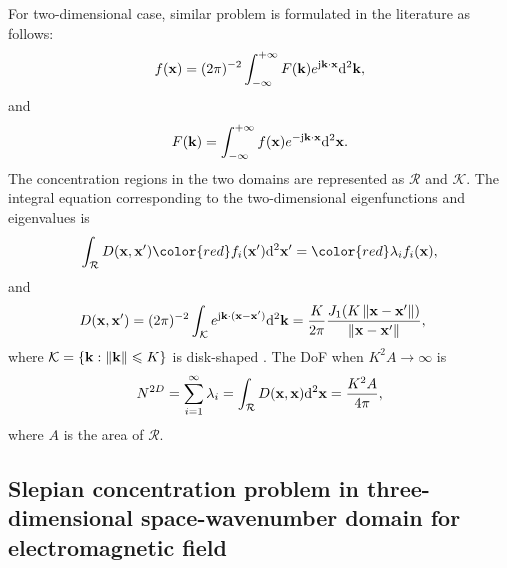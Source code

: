 \documentclass[12pt,draftclsnofoot,journal,onecolumn]{IEEEtran}
\begin{document}
	For two-dimensional case, similar problem is formulated in the literature as follows:
	\begin{equation}
		\begin{aligned}
			f({\bf x})=(2\pi)^{-2}\int_{-\infty}^{+\infty}F({\bf k})e^{{\rm j}{\bf k}\cdot {\bf x}}{\rm d}^2{\bf k},
		\end{aligned}
		\label{eq_2d_fourier}
	\end{equation}
	and
	\begin{equation}
		\begin{aligned}
			F({\bf k}) = \int_{-\infty}^{+\infty}f({\bf x})e^{-{\rm j}{\bf k}\cdot {\bf x}}{\rm d}^2{\bf x}.
		\end{aligned}
	\end{equation}
	{\color{red} The concentration regions in the two domains are represented as $\mathcal{R}$ and ${\mathcal{K}}$.} The integral equation corresponding to the two-dimensional eigenfunctions and eigenvalues is 
	\begin{equation}
		\begin{aligned}
			\int_{\mathcal{R}}D({\bf x},{\bf x}'){\color{red}f_i({\bf x}')}{\rm d}^2{\bf x}' = {\color{red}\lambda_i f_i({\bf x})},
		\end{aligned}
		\label{eqn_2d_integral}
	\end{equation}
	and
	\begin{equation}
		\begin{aligned}
			D({\bf x},{\bf x}') &= (2\pi)^{-2}\int_{\mathcal{K}} e^{{\rm j}{\bf k}\cdot({\bf x}-{\bf x}')}{\rm d}^2{\bf k} = \frac{K}{2\pi} \frac{J_1(K\left\| {\bf x}-{\bf x}' \right\|)}{\left\| {\bf x}-{\bf x}' \right\|},
		\end{aligned}
	\end{equation}
	where $\mathcal{K} = \{{\bf k} : \left\| {\bf k} \right\|\leqslant K\}$ is disk-shaped \cite{beylkin2007grids}. 
	The DoF when $K^2A \rightarrow \infty$ is 
	\begin{equation}
		\begin{aligned}
			N^{2D} = \sum_{i=1}^\infty \lambda_i = \int_{\mathcal{R}}D({\bf x},{\bf x}){\rm d}^2{\bf x} = \frac{K^2A}{4\pi},
		\end{aligned}
		\label{eq_2d_dof}
	\end{equation}
	where $A$ is the area of $\mathcal{R}$. 
	
	\subsection{Slepian concentration problem in three-dimensional space-wavenumber domain for electromagnetic field}
	\label{subsec_3d_slepian}
	
\end{document}
